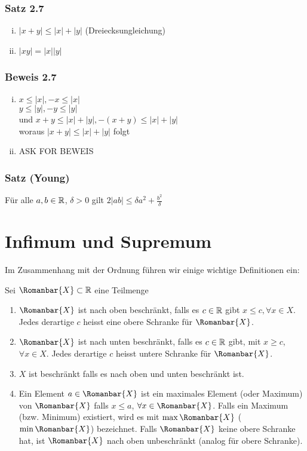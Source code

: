 \begin{enumerate}
\subsubsection*{Satz 2.7}
\begin{enumerate}[i)]
\item $\left| {x + y} \right| \le \left| x \right| + \left| y \right|$ (Dreiecksungleichung)
\item $\left| {xy} \right| = \left| x \right|\left| y \right|$
\end{enumerate}
\subsubsection*{Beweis 2.7}
\begin{enumerate}[i)]
\item $x \le \left| x \right|, - x \le \left| x \right|$\\$y \le \left| y \right|, - y \le \left| y \right|$\\und $x+y\leq  \left| x \right| +  \left| y \right|, - (x + y) \le \left| x \right| + \left| y \right|$ \\ woraus $\left| {x + y} \right| \le \left| x \right| + \left| y \right|$ folgt
\item ASK FOR BEWEIS
\end{enumerate}

\subsubsection*{Satz (Young)}
Für alle $a,b\in\mathbb{R}$, $\delta >0$ gilt $2\left| {ab} \right| \le \delta {a^2} + \frac{{{b^2}}}{\delta }$
\end{enumerate}

\section{Infimum und Supremum}
Im Zusammenhang mit der Ordnung führen wir einige wichtige Definitionen ein:

\begin{definition}{2.8}
Sei $\Romanbar{X}\subset\R$ eine Teilmenge
\begin{enumerate}[\indent a)]
\item $\Romanbar{X}$ ist nach oben beschränkt, falls es $c\in\mathbb{R}$ gibt $x\leq c, \forall x\in X$. Jedes derartige $c$ heisst eine obere Schranke für $\Romanbar{X}$.
\item $\Romanbar{X}$ ist nach unten beschränkt, falls es $c\in\mathbb{R}$ gibt, mit $x\geq c$, $\forall x\in X$. Jedes derartige $c$ heisst untere Schranke für $\Romanbar{X}$.
\item $X$ ist beschränkt falls es nach oben und unten beschränkt ist.
\item Ein Element $a\in\Romanbar{X}$ ist ein maximales Element (oder Maximum) von $\Romanbar{X}$ falls $x\leq a$, $\forall x\in\Romanbar{X}$. Falls ein Maximum (bzw. Minimum) existiert, wird es mit $\max\Romanbar{X}$ ($\min\Romanbar{X}$) bezeichnet. Falls $\Romanbar{X}$ keine obere Schranke hat, ist $\Romanbar{X}$ nach oben unbeschränkt (analog für obere Schranke).
\end{enumerate}
\end{definition}
